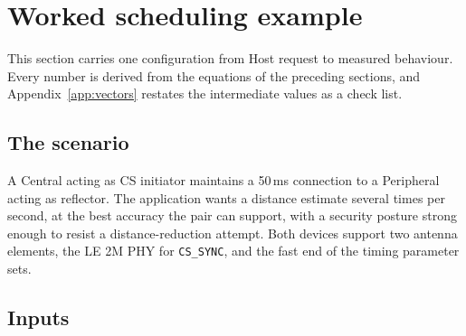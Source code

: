 \documentclass[11pt,a4paper]{article}
\newcommand{\code}[1]{\texttt{\small #1}}
\begin{document}
\section{Worked scheduling example}
\label{sec:worked}

This section carries one configuration from Host request to measured behaviour. Every number is
derived from the equations of the preceding sections, and Appendix~\ref{app:vectors} restates the
intermediate values as a check list.

\subsection{The scenario}

A Central acting as CS initiator maintains a 50\,ms connection to a Peripheral acting as reflector.
The application wants a distance estimate several times per second, at the best accuracy the pair can
support, with a security posture strong enough to resist a distance-reduction attempt. Both devices
support two antenna elements, the LE 2M PHY for \code{CS\_SYNC}, and the fast end of the timing
parameter sets.

\subsection{Inputs}
\end{document}
